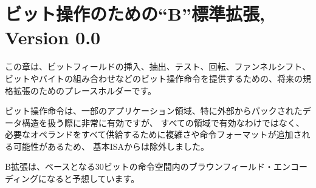 \begin{comment}
\chapter{``B'' Standard Extension for Bit Manipulation, Version 0.0}
\end{comment}
\chapter{ビット操作のための``B''標準拡張, Version 0.0}
\label{sec:bits}

\begin{comment}
This chapter is a placeholder for a future standard extension to
provide bit manipulation instructions, including instructions to
insert, extract, and test bit fields, and for rotations, funnel
shifts, and bit and byte permutations.
\end{comment}
この章は、ビットフィールドの挿入、抽出、テスト、回転、ファンネルシフト、
ビットやバイトの組み合わせなどのビット操作命令を提供するための、将来の規格拡張のためのプレースホルダーです。


\begin{commentary}
\begin{comment}
Although bit manipulation instructions are very effective in some
application domains, particularly when dealing with externally packed
data structures, we excluded them from the base ISA as they are not
useful in all domains and can add additional complexity or instruction
formats to supply all needed operands.

We anticipate the B extension will be a brownfield encoding within the
base 30-bit instruction space.
\end{comment}
ビット操作命令は、一部のアプリケーション領域、特に外部からパックされたデータ構造を扱う際に非常に有効ですが、
すべての領域で有効なわけではなく、必要なオペランドをすべて供給するために複雑さや命令フォーマットが追加される可能性があるため、
基本ISAからは除外しました。

B拡張は、ベースとなる30ビットの命令空間内のブラウンフィールド・エンコーディングになると予想しています。
\end{commentary}


